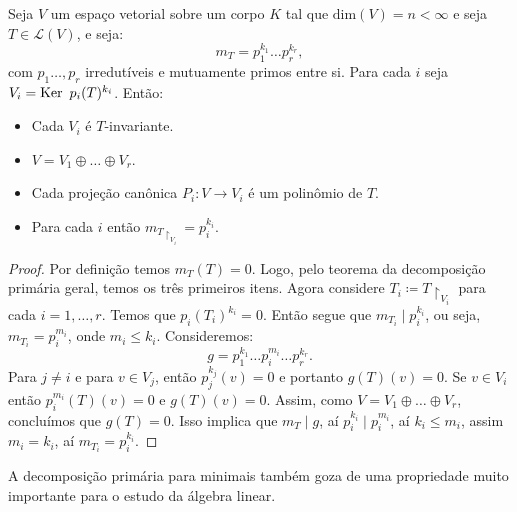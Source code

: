 \documentclass[11pt,twoside,a4paper]{book}
\begin{document}
\begin{teorema}\label{primaria minimal}
Seja \(V\) um espaço vetorial sobre um corpo \(K\) tal que
\(\text{dim}(V)=n<\infty\) e seja \(T\in\mathcal{L}(V)\), e seja:
\[
m_T=p_1^{k_1}\ldots p_r^{k_r},
\]
com \(p_1\dots,p_r\) irredutíveis e mutuamente
primos entre si. Para cada $i$ seja $V_i=\operatorname{Ker} \ p_i(T)^{k_i}$. Então:
\begin{itemize}
\item Cada $V_i$ é $T$-invariante.
\item $V=V_1\oplus\dots\oplus V_r$.
\item Cada projeção canônica $P_i:V\rightarrow V_i$ é um polinômio de $T$.
\item Para cada $i$ então \(m_{T\upharpoonright_{V_i}}=p_i^{k_i}\).
\end{itemize}
\end{teorema}
\begin{proof}
Por definição temos \(m_T(T)=0\). Logo, pelo teorema da decomposição primária geral, temos os três primeiros itens. Agora considere \(T_i\coloneqq T\upharpoonright_{V_i}\)
para cada \(i=1,\dots,r\).
Temos que \(p_i(T_i)^{k_i}=0\). Então segue que \(m_{T_i}\mid
p_i^{k_i}\), ou seja,
\(m_{T_i}=p_i^{m_i}\), onde \(m_i\leq k_i\). Consideremos:
\[
g=p_1^{k_1}\ldots p_i^{m_i}\ldots
p_r^{k_r}.
\]
Para $j\neq i$ e para \(v\in V_j\), então \(p_j^{k_j}(v)=0\) e portanto
\(g(T)(v)=0\). Se \(v\in V_i\) então \(p_i^{m_i}(T)(v)=0\) e
\(g(T)(v)=0\). Assim, como $V=V_1\oplus\dots\oplus V_r$, concluímos que \(g(T)=0\).
Isso implica que \(m_T\mid g\), aí \(p_i^{k_i}\mid p_i^{m_i}\), aí $k_i\leq m_i$, assim $m_i=k_i$, aí \(m_{T_i}=p_i^{k_i}.\)
\end{proof}

\noindent
A decomposição primária para minimais também goza de uma propriedade muito importante para o estudo da álgebra linear.
\end{document}
